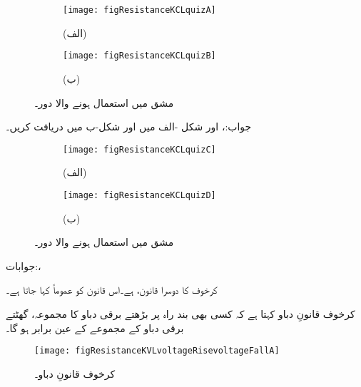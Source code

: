 \begin{figure}
\centering
\begin{subfigure}{0.34\textwidth}
\centering
\texttt{[image: figResistanceKCLquizA]}
\caption*{(الف)}
\end{subfigure}%
%
\begin{subfigure}{0.66\textwidth}
\centering
\texttt{[image: figResistanceKCLquizB]}
\caption*{(ب)}
\end{subfigure}%
\caption{مشق  میں استعمال ہونے والا دور۔}
\label{شکل_مزاحمتی_مشق_الف}
\end{figure}
جواب:،  اور 
\FloatBarrier
شکل -الف میں  اور شکل-ب میں  دریافت کریں۔
\begin{figure}[!h]
\centering
\begin{subfigure}{0.4\textwidth}
\centering
\texttt{[image: figResistanceKCLquizC]}
\caption*{(الف)}
\end{subfigure}%
%
\begin{subfigure}[scale=0.8]{0.6\textwidth}
\centering
\texttt{[image: figResistanceKCLquizD]}
\caption*{(ب)}
\end{subfigure}%
\caption{مشق  میں استعمال ہونے والا دور۔}
\label{شکل_مزاحمتی_مشق_ب}
\end{figure}

جوابات:، 
\FloatBarrier

کرخوف کا دوسرا قانون،   ہے۔اس قانون کو عموماً  کہا جاتا ہے۔

کرخوف قانونِ دباو کہتا ہے کہ کسی بھی بند راہ پر بڑھتے برقی دباو کا مجموعہ، گھٹتے برقی دباو کے مجموعے کے عین برابر ہو گا۔

\begin{figure}
\centering
\texttt{[image: figResistanceKVLvoltageRisevoltageFallA]}
\caption{کرخوف قانونِ دباو۔}
\label{شکل_مزاحمتی_قانون_دباو}
\end{figure}

